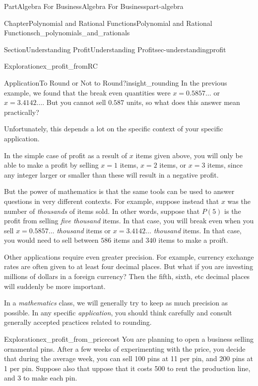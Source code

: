 \documentclass{tufte-book}
\numberwithin{equation}{chapter}
\begin{document}
\begin{partptx}{Part}{Algebra For Business}{}{Algebra For Business}{}{}{part-algebra}
\begin{chapterptx}{Chapter}{Polynomial and Rational Functions}{}{Polynomial and Rational Functions}{}{}{ch_polynomials_and_rationals}
\begin{sectionptx}{Section}{Understanding Profit}{}{Understanding Profit}{}{}{sec-understandingprofit}
\begin{exploration}{Exploration}{}{ex_profit_fromRC}
\begin{enumerate}[font=\bfseries,label=(\alph*),ref=\alph*]
\begin{image}{0.25}{0.5}{0.25}{}
{
}%
\end{image}%
\end{enumerate}%
\end{exploration}%
\begin{insight}{Application}{To Round or Not to Round?}{insight_rounding}%
In the previous example, we found that the break even quantities were  \(x=0.5857\dots\) or \(x=3.4142\dots\).  But you cannot sell \(0.587\) units, so what does this answer mean practically?%
\par
Unfortunately, this depends a lot on the specific context of your specific application.%
\par
In the simple case of \textdollar{} profit as a result of \(x\) items given above, you will only be able to make a profit by selling \(x=1\) items, \(x=2\) items, or \(x=3\) items, since any integer larger or smaller than these will result in a negative profit.%
\par
But the power of mathematics is that the same tools can be used to answer questions in very different contexts.  For example, suppose instead that \(x\) was the number of \emph{thousands} of items sold.  In other words, suppose that \(P(5)\) is the profit from selling \emph{five thousand} items.  In that case, you will break even when you sell \(x=0.5857\dots\) \emph{thousand} items or \(x=3.4142\dots\) \emph{thousand} items.  In that case, you would need to sell between \(586\) items and \(340\) items to make a proift.%
\par
Other applications require even greater precision.  For example, currency exchange rates are often given to at least four decimal places.  But what if you are investing millions of dollars in a foreign currency?  Then the fifth, sixth, etc decimal places will suddenly be more important.%
\par
In a \emph{mathematics} class, we will generally try to keep as much precision as possible.  In any specific \emph{application}, you should think carefully and consult generally accepted practices related to rounding.%
\end{insight}
\begin{exploration}{Exploration}{}{ex_profit_from_pricecost}%
You are planning to open a business selling ornamental pins. After a few weeks of experimenting with the price, you decide that during the average week, you can sell 100 pins at \textdollar{}11 per pin, and 200 pins at \textdollar{}1 per pin. Suppose also that uppose that it costs \textdollar{}500 to rent the production line, and \textdollar{}3 to make each pin.%

\end{exploration}
\end{sectionptx}
\end{chapterptx}
\end{partptx}
\end{document}
